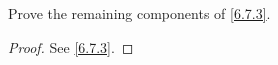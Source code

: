 \exercisesection

\begin{ex}\label{ex:6.7.1}
  Prove the remaining components of \cref{6.7.3}.
\end{ex}

\begin{proof}
  See \cref{6.7.3}.
\end{proof}
